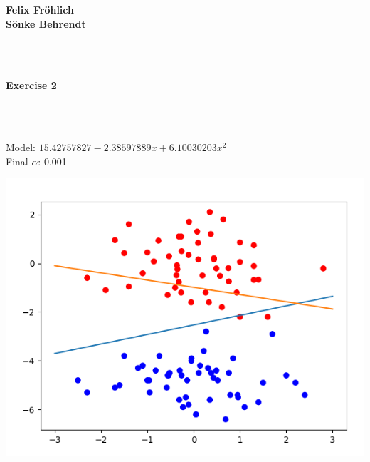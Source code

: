 \documentclass[a4paper]{article}
\begin{document}
\vspace*{-3cm}

\raggedleft
\textbf{Felix Fröhlich} \\
\textbf{Sönke Behrendt}

\centering {

}
~\\~\\
\begin{Large}
\textbf{Exercise 2}
\end{Large}

~\\~\\
\raggedright
Model: $15.42757827 - 2.38597889x + 6.10030203x^2$ \\
Final $\alpha$: 0.001

\centering
\includegraphics[width=1\textwidth]{graph.png}
\end{document}
